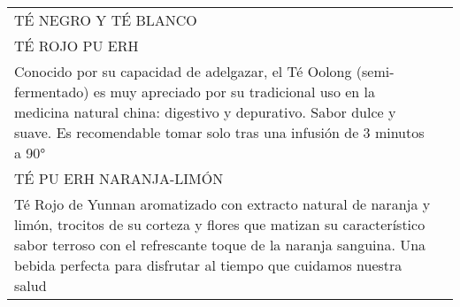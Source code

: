 \documentclass[12pt]{article}
\makeatletter
\newcommand*\ColText[1]{\textcolor{Goldenrod3}{#1}}
\newenvironment{Group}[1]
{\noindent\begin{tabular*}{\textwidth}{@{}p{1\linewidth}@{\extracolsep{\fill}}r@{}}
{\fontsize{24}{29}\selectfont\ColText{#1}}
              \\[0.8em]}
              {
\end{tabular*}}
\newcommand*\Entry[1]{%
    \sffamily#1}
\newcommand*\Expl[1]{%
    \hspace*{1em}\footnotesize #1}
\makeatother
\begin{document}
\begin{Group}{TÉ NEGRO Y TÉ BLANCO}
        \Entry{TÉ ROJO PU ERH} \\
        \Expl{Conocido por su capacidad de adelgazar, el Té Oolong (semi-fermentado) es muy apreciado por su tradicional uso en la medicina natural china: digestivo y depurativo. Sabor dulce y suave. Es recomendable tomar solo tras una infusión de 3 minutos a 90°} \\
        \Entry{TÉ PU ERH NARANJA-LIMÓN} \\
        \Expl{Té Rojo de Yunnan aromatizado con extracto natural de naranja y limón, trocitos de su corteza y flores que matizan su característico sabor terroso con el refrescante toque de la naranja sanguina. Una bebida perfecta para disfrutar al tiempo que cuidamos nuestra salud} \\
    \end{Group}
\end{document}
